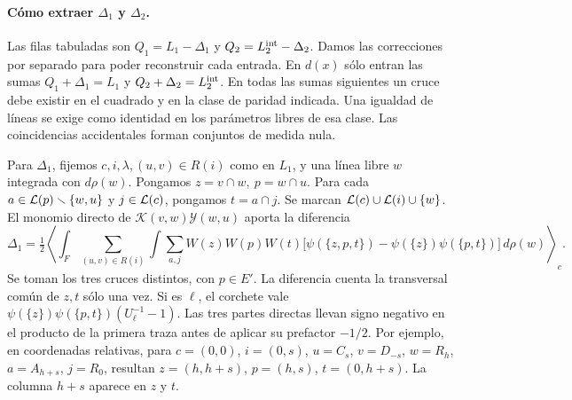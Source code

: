 \paragraph{Cómo extraer \(\Delta_1\) y \(\Delta_2\).}
Las filas tabuladas son \(Q_1=L_1-\Delta_1\) y \(Q_2=L_2^{\rm int}-\Delta_2\).
Damos las correcciones por separado para poder reconstruir cada entrada. En \(d(x)\) sólo entran
las sumas \(Q_1+\Delta_1=L_1\) y \(Q_2+\Delta_2=L_2^{\rm int}\). En todas las
sumas siguientes un cruce debe existir en el cuadrado y en la clase de paridad indicada.
Una igualdad de líneas se exige como identidad en los parámetros libres de esa clase.
Las coincidencias accidentales forman conjuntos de medida nula.

Para \(\Delta_1\), fijemos \(c,i,\lambda,(u,v)\in R(i)\) como en \(L_1\), y una
línea libre \(w\) integrada con \(d\rho(w)\). Pongamos \(z=v\cap w,\ p=w\cap u\).
Para cada \(a\in \mathcal L(p)\smallsetminus\{w,u\}\) y \(j\in \mathcal L(c)\), pongamos \(t=a\cap j\).
Se marcan \(\mathcal L(c)\cup \mathcal L(i)\cup\{w\}\).
El monomio directo de \(\mathcal K(v,w)\mathcal Y(w,u)\) aporta la diferencia
\[
 \Delta_1=\tfrac12\left\langle\int_F\sum_{(u,v)\in R(i)}
 \int\sum_{a,j} W(z)W(p)W(t)
 \big[\psi(\{z,p,t\})-\psi(\{z\})\psi(\{p,t\})\big]\,d\rho(w)\right\rangle_c .
\]
Se toman los tres cruces distintos, con \(p\in E'\). La diferencia cuenta la transversal
común de \(z,t\) sólo una vez. Si es \(\ell\), el corchete vale
\(\psi(\{z\})\psi(\{p,t\})(U_\ell^{-1}-1)\).
Las tres partes directas llevan signo negativo en el producto de la primera traza
antes de aplicar su prefactor \(-1/2\).
Por ejemplo, en coordenadas relativas, para \(c=(0,0)\), \(i=(0,s)\), \(u=C_s\),
\(v=D_{-s}\), \(w=R_h\), \(a=A_{h+s}\), \(j=R_0\), resultan \(z=(h,h+s)\),
\(p=(h,s)\), \(t=(0,h+s)\). La columna \(h+s\) aparece en \(z\) y \(t\).

